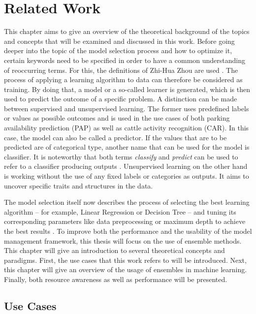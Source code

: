 \chapter{Related Work} \label{chap:relatedwork}

This chapter aims to give an overview of the theoretical background of the topics and concepts that will be examined and discussed in this work. Before going deeper into the topic of the model selection process and how to optimize it, certain keywords need to be specified in order to have a common understanding of reoccurring terms. For this, the definitions of Zhi-Hua Zhou are used \cite{zhou2012}. The process of applying a learning algorithm to data can therefore be considered as training. By doing that, a model or a so-called learner is generated, which is then used to predict the outcome of a specific problem. A distinction can be made between supervised and unsupervised learning. The former uses predefined labels or values as possible outcomes and is used in the use cases of both parking availability prediction (PAP) as well as cattle activity recognition (CAR). In this case, the model can also be called a predictor. If the values that are to be predicted are of categorical type, another name that can be used for the model is classifier. It is noteworthy that both terms \textit{classify} and \textit{predict} can be used to refer to a classifier producing outputs \cite{james2023}. Unsupervised learning on the other hand is working without the use of any fixed labels or categories as outputs. It aims to uncover specific traits and structures in the data.

The model selection itself now describes the process of selecting the best learning algorithm – for example, Linear Regression or Decision Tree – and tuning its corresponding parameters like data preprocessing or maximum depth to achieve the best results \cite{zhou2012}. To improve both the performance and the usability of the model management framework, this thesis will focus on the use of ensemble methods. This chapter will give an introduction to several theoretical concepts and paradigms. First, the use cases that this work refers to will be introduced. Next, this chapter will give an overview of the usage of ensembles in machine learning. Finally, both resource awareness as well as performance will be presented.





\section{Use Cases}\label{usecases}


